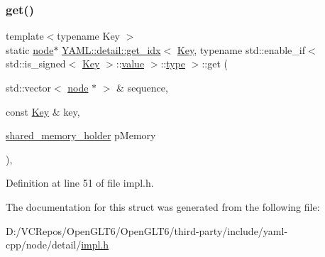 \subsubsection{\texorpdfstring{get()}{get()}\hspace{0.1cm}{\footnotesize\ttfamily [2/2]}}
{\footnotesize\ttfamily template$<$typename Key $>$ \\
static \mbox{\hyperlink{class_y_a_m_l_1_1detail_1_1node}{node}}$\ast$ \mbox{\hyperlink{struct_y_a_m_l_1_1detail_1_1get__idx}{Y\+A\+M\+L\+::detail\+::get\+\_\+idx}}$<$ \mbox{\hyperlink{namespace_y_a_m_l_a67c320aa50d3de7ecba1d0b8775dd684a1af533fc24b0311b8c4d5ac2870283aa}{Key}}, typename std\+::enable\+\_\+if$<$ std\+::is\+\_\+signed$<$ \mbox{\hyperlink{namespace_y_a_m_l_a67c320aa50d3de7ecba1d0b8775dd684a1af533fc24b0311b8c4d5ac2870283aa}{Key}} $>$\+::\mbox{\hyperlink{glad_8h_a03aff08f73d7fde3d1a08e0abd8e84fa}{value}} $>$\+::\mbox{\hyperlink{glad_8h_a890efa53b3d7deeeced6f3a0d6653ed3}{type}} $>$\+::get (\begin{DoxyParamCaption}\item[{std\+::vector$<$ \mbox{\hyperlink{class_y_a_m_l_1_1detail_1_1node}{node}} $\ast$ $>$ \&}]{sequence,  }\item[{const \mbox{\hyperlink{namespace_y_a_m_l_a67c320aa50d3de7ecba1d0b8775dd684a1af533fc24b0311b8c4d5ac2870283aa}{Key}} \&}]{key,  }\item[{\mbox{\hyperlink{namespace_y_a_m_l_1_1detail_a228c4b3b6ba1058b474d40afc218e21d}{shared\+\_\+memory\+\_\+holder}}}]{p\+Memory }\end{DoxyParamCaption})\hspace{0.3cm}{\ttfamily [inline]}, {\ttfamily [static]}}



Definition at line 51 of file impl.\+h.



The documentation for this struct was generated from the following file\+:\begin{DoxyCompactItemize}
\item 
D\+:/\+V\+C\+Repos/\+Open\+G\+L\+T6/\+Open\+G\+L\+T6/third-\/party/include/yaml-\/cpp/node/detail/\mbox{\hyperlink{detail_2impl_8h}{impl.\+h}}\end{DoxyCompactItemize}
